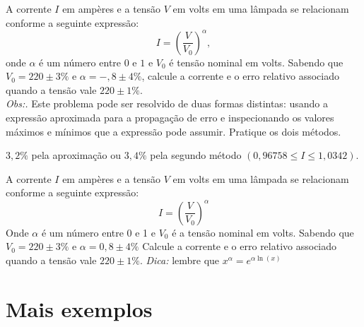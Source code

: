 \begin{Exercise} A corrente $I$ em ampères e a tensão $V$ em volts em uma lâmpada se relacionam conforme a seguinte expressão:
  \begin{equation*}
    I=\left(\frac{V}{V_0}\right)^\alpha,
  \end{equation*}
onde $\alpha$ é um número entre $0$ e $1$ e $V_0$ é tensão nominal em volts. Sabendo que $V_0=220\pm 3\%$ e $\alpha=-,8\pm 4\%$, calcule a corrente e o erro relativo associado quando a tensão vale $220\pm 1\%$.\\
\emph{Obs:.} Este problema pode ser resolvido de duas formas distintas: usando a expressão aproximada para a propagação de erro e inspecionando os valores máximos e mínimos que a expressão pode assumir. Pratique os dois métodos.
\end{Exercise}
\begin{Answer}
  \begin{tiny}
    $3,2\%$ pela aproximação ou $3,4\%$ pela segundo método  $\left(0,96758 \leq I\leq 1,0342\right)$.
  \end{tiny} 
\end{Answer}

\begin{Exercise} A corrente $I$ em ampères e a tensão $V$ em volts em uma lâmpada se relacionam conforme a seguinte expressão:
$$I=\left(\frac{V}{V_0}\right)^\alpha$$
Onde $\alpha$ é um número entre 0 e 1 e $V_0$ é a tensão nominal em volts. Sabendo que $V_0=220\pm 3\%$ e $\alpha=0,8\pm 4\%$
Calcule a corrente e o erro relativo associado quando a tensão vale $220\pm 1\%$.
\emph{Dica:} lembre que $x^\alpha=e^{\alpha \ln(x)}$
\end{Exercise}

\section{Mais exemplos}

